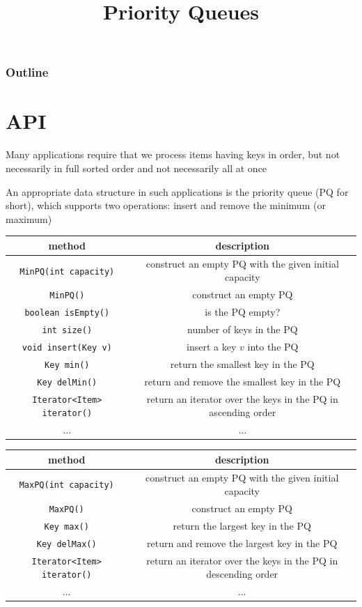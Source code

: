 \documentclass[8pt,a4paper,compress]{beamer}
\title{Priority Queues}
\date{}
\begin{document}
\begin{frame}
\vfill
\titlepage
\end{frame}

\begin{frame}
\frametitle{Outline}
\tableofcontents
\end{frame}

\section{API}
\begin{frame}[fragile]
\pause

Many applications require that we process items having keys in order, but not necessarily in full sorted order and not necessarily all at once

\pause
\bigskip

An appropriate data structure in such applications is the priority queue (PQ for short), which supports two operations: insert and remove the minimum (or maximum)

\pause

\begin{center}
\begin{tabular}{cc}
method & description \\ \hline
\lstinline$MinPQ(int capacity)$ & construct an empty PQ with the given initial capacity \\
\lstinline$MinPQ()$ & construct an empty PQ \\
\lstinline$boolean isEmpty()$ & is the PQ empty? \\
\lstinline$int size()$ & number of keys in the PQ \\
\lstinline$void insert(Key v)$ & insert a key $v$ into the PQ \\
\lstinline$Key min()$ & return the smallest key in the PQ \\
\lstinline$Key delMin()$ & return and remove the smallest key in the PQ \\
\lstinline$Iterator<Item> iterator()$ & return an iterator over the keys in the PQ in ascending order \\
$\dots$ & $\dots$
\end{tabular} 
\end{center}

\pause
\smallskip

\begin{center}
\begin{tabular}{cc}
method & description \\ \hline
\lstinline$MaxPQ(int capacity)$ & construct an empty PQ with the given initial capacity \\
\lstinline$MaxPQ()$ & construct an empty PQ \\
\lstinline$Key max()$ & return the largest key in the PQ \\
\lstinline$Key delMax()$ & return and remove the largest key in the PQ \\
\lstinline$Iterator<Item> iterator()$ & return an iterator over the keys in the PQ in descending order \\
$\dots$ & $\dots$
\end{tabular} 
\end{center}
\end{frame}
\end{document}
